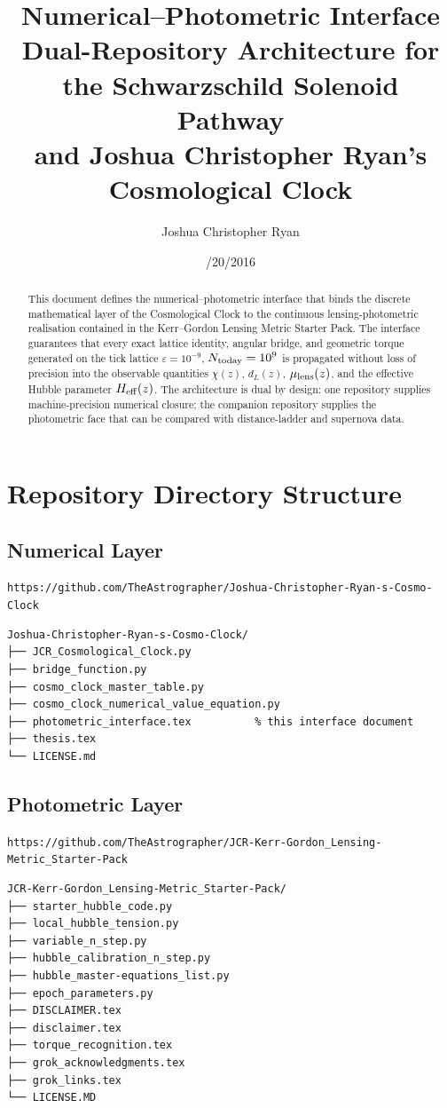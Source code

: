 \documentclass[11pt,a4paper]{article}
\title{Numerical--Photometric Interface\\
\large Dual-Repository Architecture for the Schwarzschild Solenoid Pathway\\
and Joshua Christopher Ryan's Cosmological Clock}
\author{Joshua Christopher Ryan}
\date{\8/20/2016}
\begin{document}
\maketitle

\begin{abstract}
This document defines the numerical--photometric interface that binds the discrete mathematical layer of the Cosmological Clock to the continuous lensing-photometric realisation contained in the Kerr--Gordon Lensing Metric Starter Pack. The interface guarantees that every exact lattice identity, angular bridge, and geometric torque generated on the tick lattice \(\varepsilon=10^{-9}\), \(N_{\rm today}=10^{9}\) is propagated without loss of precision into the observable quantities \(\chi(z)\), \(d_L(z)\), \(\mu_{\rm lens}(z)\), and the effective Hubble parameter \(H_{\rm eff}(z)\). The architecture is dual by design: one repository supplies machine-precision numerical closure; the companion repository supplies the photometric face that can be compared with distance-ladder and supernova data.
\end{abstract}

\section{Repository Directory Structure}

\subsection{Numerical Layer}
\texttt{https://github.com/TheAstrographer/Joshua-Christopher-Ryan-s-Cosmo-Clock}

\begin{verbatim}
Joshua-Christopher-Ryan-s-Cosmo-Clock/
├── JCR_Cosmological_Clock.py
├── bridge_function.py
├── cosmo_clock_master_table.py
├── cosmo_clock_numerical_value_equation.py
├── photometric_interface.tex          % this interface document
├── thesis.tex
└── LICENSE.md
\end{verbatim}

\subsection{Photometric Layer}
\texttt{https://github.com/TheAstrographer/JCR-Kerr-Gordon_Lensing-Metric_Starter-Pack}

\begin{verbatim}
JCR-Kerr-Gordon_Lensing-Metric_Starter-Pack/
├── starter_hubble_code.py
├── local_hubble_tension.py
├── variable_n_step.py
├── hubble_calibration_n_step.py
├── hubble_master-equations_list.py
├── epoch_parameters.py
├── DISCLAIMER.tex
├── disclaimer.tex
├── torque_recognition.tex
├── grok_acknowledgments.tex
├── grok_links.tex
└── LICENSE.MD
\end{verbatim}
\end{document}
